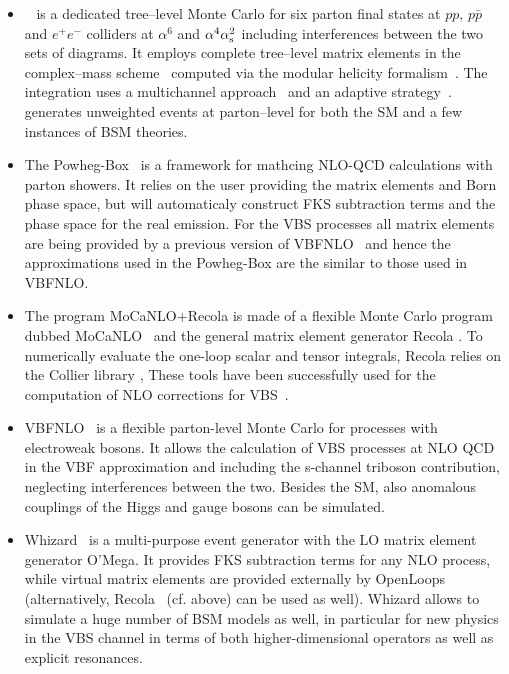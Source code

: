\begin{itemize}
  \item {{}~\cite{Ballestrero:2007xq} is a dedicated tree--level Monte Carlo for six parton final states at $pp,\, p\bar{p}$
  and $e^+e^-$ colliders at $\alpha^6$ and $\alpha^4\alpha_\text{s}^2$ including interferences between the two sets of diagrams.
It employs complete tree--level matrix elements in the complex--mass scheme~\cite{Denner:2006ic} computed via the modular helicity 
formalism~\cite{Ballestrero:1999md,Ballestrero:1994jn}. The integration uses a multichannel approach~\cite{BERENDS1985441} and an adaptive
strategy~\cite{PETERLEPAGE1978192}. {} generates unweighted events at parton--level for both the SM and a few instances of BSM theories.}      

  \item The {\sc Powheg-Box}~\cite{Alioli:2010xd,Frixione:2007vw} is a framework for mathcing NLO-QCD calculations with parton showers.
It relies on the user providing the matrix elements and Born phase space, but will automaticaly construct FKS \cite{Frixione:1995ms} subtraction terms and the phase space for the real emission.
For the VBS processes all matrix elements are being provided by a previous version of {\sc VBFNLO}~\cite{Arnold:2008rz, Arnold:2011wj, Baglio:2014uba} and hence the approximations used in the {\sc Powheg-Box} are the similar to those used in {\sc VBFNLO}.

  \item The program {\sc MoCaNLO+Recola} is made of a flexible Monte Carlo program dubbed {\sc MoCaNLO}~\cite{MoCaNLO} and the general matrix element generator {\sc Recola} \cite{Actis:2012qn,Actis:2016mpe}.
To numerically evaluate the one-loop scalar and tensor integrals, {\sc Recola} relies on the {\sc Collier} library \cite{Denner:2014gla,Denner:2016kdg},
These tools have been successfully used for the computation of NLO corrections for VBS~\cite{Biedermann:2016yds,Biedermann:2017bss}.

  \item {\sc VBFNLO}~\cite{Arnold:2008rz, Arnold:2011wj, Baglio:2014uba} is a flexible
parton-level Monte Carlo for processes with electroweak bosons. It
allows the calculation of VBS processes at NLO QCD in the VBF
approximation and including the s-channel triboson contribution,
neglecting interferences between the two. Besides the SM, also anomalous
couplings of the Higgs and gauge bosons can be simulated.

  \item {\sc Whizard}~\cite{Moretti:2001zz,Kilian:2007gr} is a multi-purpose
event generator with the LO matrix element generator {\sc O'Mega}. It
provides FKS subtraction terms for any NLO process, while virtual matrix
elements are provided externally by {\sc
OpenLoops}~\cite{Cascioli:2011va} (alternatively, {\sc Recola}~\cite{Actis:2012qn,Actis:2016mpe}
(cf. above) can be used as well). {\sc Whizard} allows to simulate a
huge number of BSM models as well, in particular for new physics in
the VBS channel in terms of both higher-dimensional operators as well as explicit
resonances.

\end{itemize}


%
%
